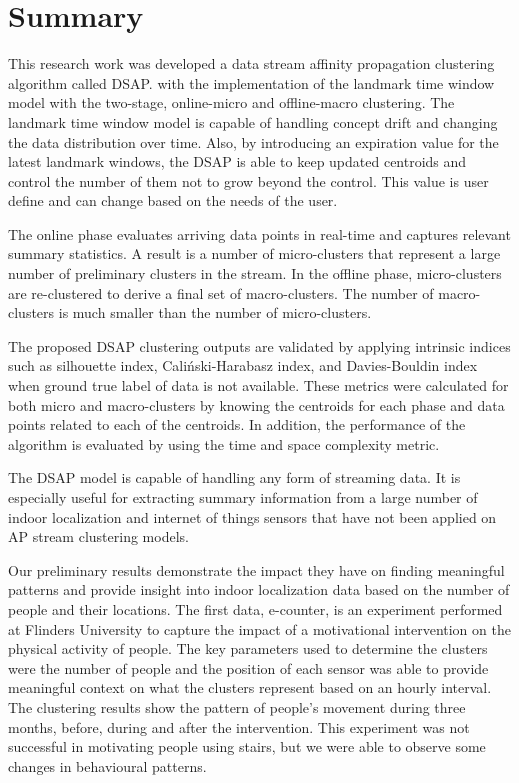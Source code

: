 \section{Summary}
This research work was developed a data stream affinity propagation clustering algorithm called DSAP. with the implementation of the landmark time window model with the two-stage, online-micro and offline-macro clustering. The landmark time window model is capable of handling concept drift and changing the data distribution over time. Also, by introducing an expiration value for the latest landmark windows, the DSAP is able to keep updated centroids and control the number of them not to grow beyond the control. This value is user define and can change based on the needs of the user.

The online phase evaluates arriving data points in real-time and captures
relevant summary statistics. A result is a number of micro-clusters that represent a large number of
preliminary clusters in the stream. In the offline phase, micro-clusters are re-clustered to derive a final set of macro-clusters. The number of macro-clusters is much smaller than the number of micro-clusters.

The proposed DSAP clustering outputs are validated by applying intrinsic indices such as silhouette index, Caliński-Harabasz index, and Davies-Bouldin index when ground true label of data is not available. These metrics were calculated for both micro and macro-clusters by knowing the centroids for each phase and data points related to each of the centroids.
In addition, the performance of the algorithm is evaluated by using the time and space complexity metric. 


The DSAP model is capable of handling any form of streaming data. It is especially useful for extracting summary information from a large number of indoor localization and internet of things sensors that have not been applied on AP stream clustering models.

Our preliminary results demonstrate the impact they have on finding meaningful patterns and provide insight into indoor localization data based on the number of people and their locations. The first data, e-counter, is an experiment performed at Flinders University to capture the impact of a motivational intervention on the physical activity of people. The key parameters used to determine the clusters were the number of people and the position of each sensor was able to provide meaningful context on what the clusters represent based on an hourly interval. The clustering results show the pattern of people's movement during three months, before, during and after the intervention. This experiment was not successful in motivating people using stairs, but we were able to observe some changes in behavioural patterns. 

